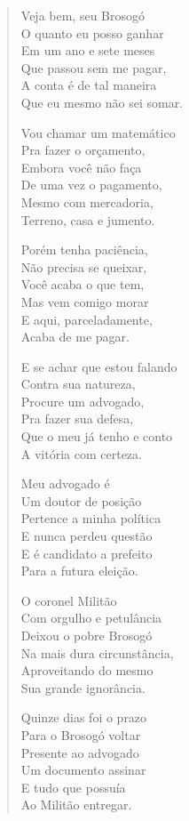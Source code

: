 \begin{verse}
Veja bem, seu Brosogó\\
O quanto eu posso ganhar\\
Em um ano e sete meses\\
Que passou sem me pagar,\\
A conta é de tal maneira\\
Que eu mesmo não sei somar.

Vou chamar um matemático\\
Pra fazer o orçamento,\\
Embora você não faça\\
De uma vez o pagamento,\\
Mesmo com mercadoria,\\
Terreno, casa e jumento.

Porém tenha paciência,\\
Não precisa se queixar,\\
Você acaba o que tem,\\
Mas vem comigo morar\\
E aqui, parceladamente,\\
Acaba de me pagar.

E se achar que estou falando\\
Contra sua natureza,\\
Procure um advogado,\\
Pra fazer sua defesa,\\
Que o meu já tenho e conto\\
A vitória com certeza.

Meu advogado é\\
Um doutor de posição\\
Pertence a minha política\\
E nunca perdeu questão\\
E é candidato a prefeito\\
Para a futura eleição.

O coronel Militão\\
Com orgulho e petulância\\
Deixou o pobre Brosogó\\
Na mais dura circunstância,\\
Aproveitando do mesmo\\
Sua grande ignorância.

Quinze dias foi o prazo\\
Para o Brosogó voltar\\
Presente ao advogado\\
Um documento assinar\\
E tudo que possuía\\
Ao Militão entregar.


\end{verse}
